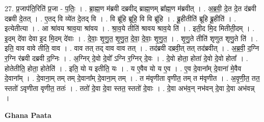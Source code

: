 \documentclass[17pt]{extarticle}
\begin{document}
27. प्र॒जाप॑ति॒रिति॑ प्र॒जा - प॒तिः॒ । . ब्रा॒ह्म॒ण म॑ब्रवी दब्रवीद् ब्राह्म॒णम् ब्रा᳚ह्म॒ण म॑ब्रवीत् । . अ॒ब्र॒वी॒ दे॒त दे॒त द॑ब्रवी दब्रवी दे॒तत् । . ए॒तद् वि व्ये॑त दे॒तद् वि । . वि ब्रू॑हि ब्रूहि॒ वि वि ब्रू॑हि । . ब्रू॒हीतीति॑ ब्रूहि ब्रू॒हीति॑ । . इत्येतीत्या । . आ श्रा॑वय श्राव॒या श्रा॑वय । . श्रा॒व॒ये तीति॑ श्रावय श्राव॒ये ति॑ । . इती॒द मि॒द मितीती॒दम् । . इ॒दम् दे॑वा देवा इ॒द मि॒दम् दे॑वाः । . दे॒वाः॒ शृ॒णु॒त॒ शृ॒णु॒त॒ दे॒वा॒ दे॒वाः॒ शृ॒णु॒त॒ । . शृ॒णु॒ते तीति॑ शृणुत शृणु॒ते ति॑ । . इति॒ वाव वावे तीति॒ वाव । . वाव तत् तद् वाव वाव तत् । . तद॑ब्रवी दब्रवी॒त् तत् तद॑ब्रवीत् । . अ॒ब्र॒वी॒ द॒ग्नि र॒ग्नि र॑ब्रवी दब्रवी द॒ग्निः । . अ॒ग्निर् दे॒वो दे॒वो᳚ ऽग्नि र॒ग्निर् दे॒वः । . दे॒वो होता॒ होता॑ दे॒वो दे॒वो होता᳚ । . होतेतीति॒ होता॒ होतेति॑ । . इति॒ यो य इतीति॒ यः । . य ए॒वैव यो य ए॒व । . ए॒व दे॒वाना᳚म् दे॒वाना॑ मे॒वैव दे॒वाना᳚म् । . दे॒वाना॒म् तम् तम् दे॒वाना᳚म् दे॒वाना॒म् तम् । . त म॑वृणीता वृणीत॒ तम् त म॑वृणीत । . अ॒वृ॒णी॒त॒ तत॒ स्ततो॑ ऽवृणीता वृणीत॒ ततः॑ । . ततो॑ दे॒वा दे॒वा स्तत॒ स्ततो॑ दे॒वाः । . दे॒वा अभ॑व॒न् नभ॑वन् दे॒वा दे॒वा अभ॑वन्न् । \newline

\textbf{Ghana Paata } \newline
\end{document}
